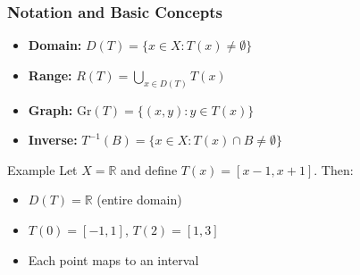 \documentclass[aspectratio=169,10pt]{beamer}
\begin{document}
\begin{frame}
\frametitle{Notation and Basic Concepts}

\begin{itemize}
    \item \textbf{Domain:} $D(T) = \{x \in X : T(x) \neq \emptyset\}$

    \item \textbf{Range:} $R(T) = \bigcup_{x \in D(T)} T(x)$

    \item \textbf{Graph:} $\text{Gr}(T) = \{(x,y) : y \in T(x)\}$

    \item \textbf{Inverse:} $T^{-1}(B) = \{x \in X : T(x) \cap B \neq \emptyset\}$
\end{itemize}

\vspace{0.5cm}

\begin{block}{Example}
Let $X = \mathbb{R}$ and define $T(x) = [x-1, x+1]$. Then:
\begin{itemize}
    \item $D(T) = \mathbb{R}$ (entire domain)
    \item $T(0) = [-1, 1]$, $T(2) = [1, 3]$
    \item Each point maps to an interval
\end{itemize}
\end{block}

\end{frame}
\end{document}
